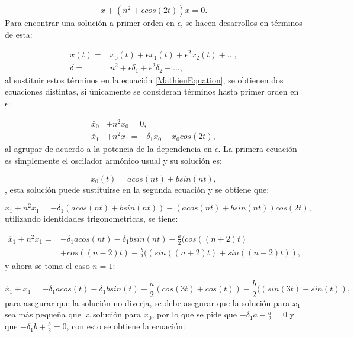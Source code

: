 \documentclass[a4paper,10pt]{report}
\begin{document}
\begin{equation} \label{MathieuEquation}
\ddot{x} + (n^2+\epsilon cos(2t))x=0.
\end{equation} Para encontrar una solución a primer orden en $\epsilon$, se hacen desarrollos en términos de esta:

\begin{align}
x(t)=& x_0(t) + \epsilon x_1(t) + \epsilon^2 x_2(t) + ... , \\
\delta =& n^2 + \epsilon \delta_1 + \epsilon^2 \delta_2 + ..., 
\end{align} al sustituir estos términos en la ecuación \ref{MathieuEquation}, se obtienen dos ecuaciones distintas, si únicamente se consideran términos hasta primer orden en $\epsilon$:

\begin{align}
\ddot{x_0}& + n^2x_0 = 0, \\
\ddot{x_1}& + n^2x_1 = -\delta_1x_0 -x_0cos(2t) ,
\end{align} al agrupar de acuerdo a la potencia de la dependencia en $\epsilon$. La primera ecuación es simplemente el oscilador armónico usual y su solución es:

\begin{equation}
x_0(t) = a cos(nt) + b sin(nt),
\end{equation}, esta solución puede sustituirse en la segunda ecuación y se obtiene que:

\begin{equation}
\ddot{x_1} + n^2x_1 = -\delta_1(a cos(nt) + b sin(nt)) -(a cos(nt) + b sin(nt))cos(2t),
\end{equation} utilizando identidades trigonometricas, se tiene:

\begin{align}
\ddot{x_1} + n^2x_1 =& \nonumber -\delta_1a cos(nt) -\delta_1b sin(nt) -\frac{a}{2}(cos((n+2)t)\\
 &+cos((n-2)t) - \frac{b}{2} ((sin((n+2)t)+sin((n-2)t)),
\end{align} y ahora se toma el caso $n=1$:

\begin{equation}
\ddot{x_1} + x_1 = -\delta_1a cos(t) -\delta_1b sin(t) -\frac{a}{2}(cos(3t)+cos(t)) - \frac{b}{2} ((sin(3t)-sin(t)),
\end{equation} para asegurar que la solución no diverja, se debe asegurar que la solución para $x_1$ sea más pequeña que la solución para $x_0$, por lo que se pide que $-\delta_1a - \frac{a}{2}=0$ y que $-\delta_1b + \frac{b}{2}=0$, con esto se obtiene la ecuación:
\end{document}
